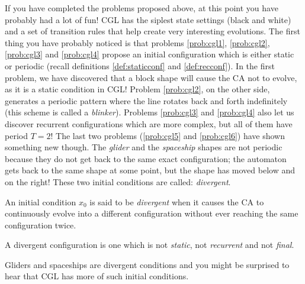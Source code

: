 If you have completed the problems proposed above, at this point you have probably had
a lot of fun! CGL has the siplest state settings (black and white) and a set of
transition rules that help create very interesting evolutions. The first thing you have probably
noticed is that problems \ref{prob:cgl1}, \ref{prob:cgl2}, \ref{prob:cgl3} and \ref{prob:cgl4}
propose an initial configuration which is either static or periodic (recall definitions
\ref{def:staticconf} and \ref{def:recconf}). 
In the first problem, we have discovered that a block shape will cause the CA not to evolve,
as it is a static condition in CGL!
Problem \ref{prob:cgl2}, on the other side, generates a periodic pattern where the line rotates
back and forth indefinitely (this scheme is called a \textit{blinker}). Problems
\ref{prob:cgl3} and \ref{prob:cgl4} also let us discover recurrent configurations which are more
complex, but all of them have period $T=2$!
The last two problems (\ref{prob:cgl5} and \ref{prob:cgl6}) have shown something new though. The
\textit{glider} and the \textit{spaceship} shapes are not periodic because they do not get back
to the same exact configuration; the automaton gets back to the same shape at some point,
but the shape has moved below and on the right!
These two initial conditions are called: \textit{divergent}.

\begin{definition}
\label{def:divconf}
An initial condition $x_0$ is said to be
\textit{divergent} when it causes the CA to continuously evolve
into a different configuration without ever reaching the same configuration twice.
\end{definition}

\begin{proposition}
A divergent configuration is one which is not \textit{static}, not \textit{recurrent} and not
\textit{final}.
\end{proposition}

Gliders and spaceships are divergent conditions and you might be surprised to hear that
CGL has more of such initial conditions.

